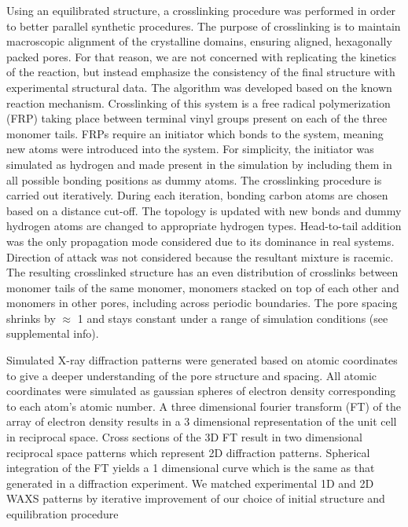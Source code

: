 
Using an equilibrated structure, a crosslinking procedure was performed
in order to better parallel synthetic procedures. The purpose of 
crosslinking is to maintain macroscopic alignment of the crystalline
domains, ensuring aligned, hexagonally packed pores. For that reason, we
are not concerned with replicating the kinetics of the reaction, but
instead emphasize the consistency of the final structure with experimental
structural data. The algorithm was developed based on the known reaction
mechanism. Crosslinking of this system is a free radical polymerization (FRP)
taking place between terminal vinyl groups present on each of the three
monomer tails. FRPs require an initiator which bonds to the system, 
meaning new atoms were introduced into the system. For simplicity, the 
initiator was simulated as hydrogen and made present in the simulation
by including them in all possible bonding positions as dummy atoms.
The crosslinking procedure is carried out iteratively. During each 
iteration, bonding carbon atoms are chosen based on a distance cut-off.
The topology is updated with new bonds and dummy hydrogen atoms are 
changed to appropriate hydrogen types. Head-to-tail addition was the
only propagation mode considered due to its dominance in real systems.
Direction of attack was not considered because the resultant mixture is
racemic. The resulting crosslinked structure has an even distribution of
crosslinks between monomer tails of the same monomer, monomers stacked on
top of each other and monomers in other pores, including across periodic
boundaries. The pore spacing shrinks by $\approx$ 1 \angstrom and stays 
constant under a range of simulation conditions (see supplemental info). 

Simulated X-ray diffraction patterns were generated based on atomic
coordinates to give a deeper understanding of the pore structure and
spacing. All atomic coordinates were simulated as gaussian spheres of
electron density  corresponding to each atom's atomic number. A three
dimensional fourier transform (FT) of the array of electron density 
results in a 3 dimensional representation of the unit cell in reciprocal
space. Cross sections of the 3D FT result in two dimensional reciprocal
space patterns which represent 2D diffraction patterns. Spherical
integration of the FT yields a 1 dimensional curve which is the same
as that generated in a diffraction experiment. We matched experimental
1D and 2D WAXS patterns by iterative improvement of our choice of 
initial structure and equilibration procedure 

